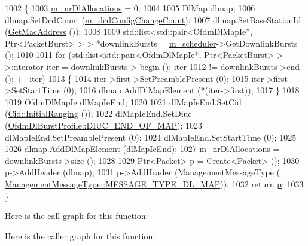 \begin{DoxyCode}
1002 \{
1003   \hyperlink{classns3_1_1BaseStationNetDevice_aef0a8f41aa4e1805c33eb3e5715e672e}{m\_nrDlAllocations} = 0;
1004 
1005   DlMap dlmap;
1006   dlmap.SetDcdCount (\hyperlink{classns3_1_1BaseStationNetDevice_abcdaea98567567d67375bea8eb9cfb56}{m\_dcdConfigChangeCount});
1007   dlmap.SetBaseStationId (\hyperlink{classns3_1_1WimaxNetDevice_aa02eb7f6de9c03f0b8f2e33e3c5b5559}{GetMacAddress} ());
1008 
1009   std::list<std::pair<OfdmDlMapIe*, Ptr<PacketBurst> > > *downlinkBursts = 
      \hyperlink{classns3_1_1BaseStationNetDevice_ae25a05b8fbaed29fd59277f928683a16}{m\_scheduler}->GetDownlinkBursts ();
1010 
1011   \textcolor{keywordflow}{for} (\hyperlink{openflow-interface_8h_afd9bcfa176617760671b67580f536fa7}{std::list}<std::pair<OfdmDlMapIe*, Ptr<PacketBurst> > >::iterator iter = downlinkBursts->
      begin (); iter
1012        != downlinkBursts->end (); ++iter)
1013     \{
1014       iter->first->SetPreamblePresent (0);
1015       iter->first->SetStartTime (0);
1016       dlmap.AddDlMapElement (*(iter->first));
1017     \}
1018 
1019   OfdmDlMapIe dlMapIeEnd;
1020 
1021   dlMapIeEnd.SetCid (\hyperlink{classns3_1_1Cid_a5c204ab0df783c7594c764bae1611436}{Cid::InitialRanging} ());
1022   dlMapIeEnd.SetDiuc (\hyperlink{classns3_1_1OfdmDlBurstProfile_a4769c73985bf918ecd21180081471a00ac230357d582ca5c2f0344f41b8c081c9}{OfdmDlBurstProfile::DIUC\_END\_OF\_MAP});
1023   dlMapIeEnd.SetPreamblePresent (0);
1024   dlMapIeEnd.SetStartTime (0);
1025 
1026   dlmap.AddDlMapElement (dlMapIeEnd);
1027   \hyperlink{classns3_1_1BaseStationNetDevice_aef0a8f41aa4e1805c33eb3e5715e672e}{m\_nrDlAllocations} = downlinkBursts->size ();
1028 
1029   Ptr<Packet> \hyperlink{lte__link__budget_8m_ac9de518908a968428863f829398a4e62}{p} = Create<Packet> ();
1030   p->AddHeader (dlmap);
1031   p->AddHeader (ManagementMessageType (
      \hyperlink{classns3_1_1ManagementMessageType_a0e0c7a1e263538f0379d1bdb015abe3da5ea5a73feaa05bbe5137d1f8363f97c4}{ManagementMessageType::MESSAGE\_TYPE\_DL\_MAP}));
1032   \textcolor{keywordflow}{return} \hyperlink{lte__link__budget_8m_ac9de518908a968428863f829398a4e62}{p};
1033 \}
\end{DoxyCode}


Here is the call graph for this function\+:




Here is the caller graph for this function\+:


